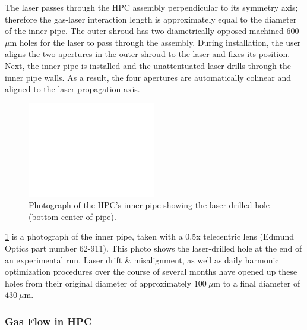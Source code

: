 The laser passes through the HPC assembly perpendicular to its symmetry axis; therefore the gas-laser interaction length is approximately equal to the diameter of the inner pipe. The outer shroud has two diametrically opposed machined 600 $\mu$m holes for the laser to pass through the assembly. During installation, the user aligns the two apertures in the outer shroud to the laser and fixes its position. Next, the inner pipe is installed and the unattentuated laser drills through the inner pipe walls. As a result, the four apertures are automatically colinear and aligned to the laser propagation axis.

\begin{figure}
	\centering
	\includegraphics[width=0.5\textwidth]{figures/chap3/HPC_laserhole_500x370.png}
	\caption{Photograph of the HPC's inner pipe showing the laser-drilled hole (bottom center of pipe).}
	\label{fig:HPC_laserhole}
\end{figure}

\cref{fig:HPC_laserhole} is a photograph of the inner pipe, taken with a 0.5x telecentric lens (Edmund Optics part number 62-911). This photo shows the laser-drilled hole at the end of an experimental run. Laser drift \&  misalignment, as well as daily harmonic optimization procedures over the course of several months have opened up these holes from their original diameter of approximately $100 \ \mu \textrm{m}$ to a final diameter of $430 \ \mu \textrm{m}$.

\subsubsection{Gas Flow in HPC}

